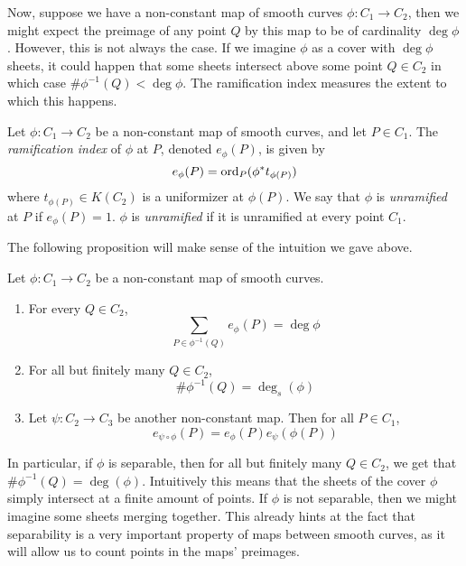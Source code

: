 
Now, suppose we have a non-constant map of smooth curves
$\phi: C_1 \to C_2$, then we might expect the preimage of any point $Q$
by this map to be of cardinality $\deg\phi$. However, this is not always
the case. If we imagine $\phi$ as a cover with $\deg\phi$ sheets,
it could happen that some sheets intersect above some point
$Q \in C_2$ in which case $\#\phi^{-1}(Q) < \deg\phi$.
The ramification index measures the extent to which this happens.

\begin{definition}
	Let $\phi: C_1 \to C_2$ be a non-constant map of smooth curves, and let
	$P \in C_1$. The \emph{ramification index} of $\phi$ at $P$, denoted
	$e_\phi(P)$, is given by
	\begin{equation*}
		e_\phi(P) = \operatorname{ord}_P(\phi^*t_{\phi(P)})
	\end{equation*}
	where $t_{\phi(P)} \in K(C_2)$ is a uniformizer at $\phi(P)$.
	We say that $\phi$ is \emph{unramified} at $P$ if $e_\phi(P) = 1$. $\phi$ is
	\emph{unramified} if it is unramified at every point $C_1$.
\end{definition}

The following proposition will make sense of the intuition we gave above.

\begin{proposition}
	\label{prop:ramification-properties}
	Let $\phi: C_1 \to C_2$ be a non-constant map of smooth curves.
	\begin{enumerate}[label=(\alph*)]
		\item For every $Q \in C_2$,
			\begin{equation*}
				\sum_{P \in \phi^{-1}(Q)}e_\phi(P) = \deg \phi
			\end{equation*}
		\item For all but finitely many $Q \in C_2$,
			\begin{equation*}
				\#\phi^{-1}(Q) = \deg_s(\phi)
			\end{equation*}
		\item Let $\psi: C_2 \to C_3$ be another non-constant map.
			Then for all $P \in C_1$,
			\begin{equation*}
				e_{\psi\circ\phi}(P) = e_{\phi}(P)e_{\psi}(\phi(P))
			\end{equation*}
	\end{enumerate}
\end{proposition}

In particular, if $\phi$ is separable, then for all but finitely many
$Q \in C_2$, we get that $\#\phi^{-1}(Q) = \deg(\phi)$. Intuitively this means
that the sheets of the cover $\phi$ simply intersect at a finite amount 
of points. If $\phi$ is not separable, then we might imagine some sheets
merging together. This already hints at the fact that separability is
a very important property of maps between smooth curves, as it will allow us
to count points in the maps' preimages.

